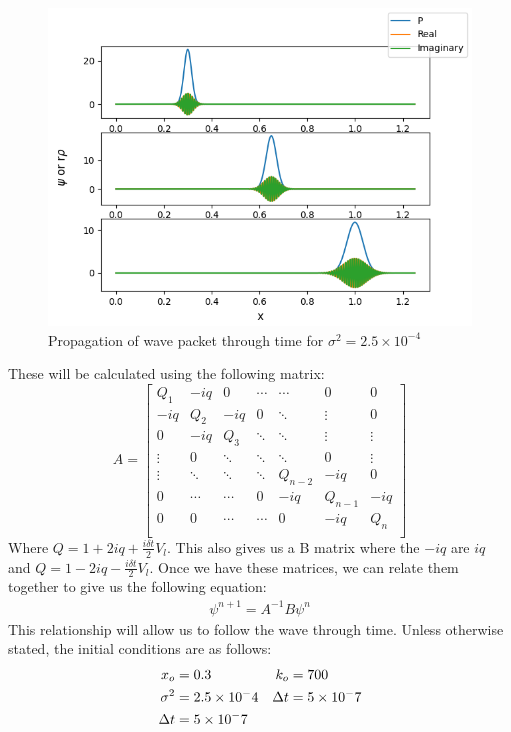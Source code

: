 \documentclass[pra,twocolumn,showpacs,amsmath,amssymb]{revtex4-2}
\begin{document}
\begin{figure}[t!]
\includegraphics[scale=0.5]{psi_x_wo.png}
\caption{Propagation of wave packet through time for $\sigma^2 = 2.5 \times 10^{-4}$}\label{Poincare0.5}
\end{figure}

\par These will be calculated using the following matrix:
\[
  A =
  \left[ {\begin{array}{ccccccc}
    Q_1 & -iq & 0 & \cdots & \cdots & 0 & 0\\
    -iq & Q_2 & -iq & 0 & \ddots & \vdots & 0\\
    0 & -iq & Q_3 & \ddots & \ddots & \vdots & \vdots\\ 
    \vdots & 0 & \ddots & \ddots & \ddots & 0 & \vdots \\
    \vdots & \ddots & \ddots & \ddots & Q_{n-2} & -iq & 0\\
    0 & \cdots & \cdots & 0 & -iq & Q_{n-1} & -iq\\
    0 & 0 & \cdots & \cdots & 0 & -iq & Q_n\\
  \end{array} } \right]
\]
Where $Q = 1 + 2iq + \frac{i\delta t}{2} V_l$. This also gives us a B matrix where the $-iq$ are $iq$ and $Q = 1 - 2iq -\frac{i\delta t}{2}V_l$. Once we have these matrices, we can relate them together to give us the following equation:
\begin{align}
    \psi^{n+1} = A^{-1} B \psi^n
\end{align}
This relationship will allow us to follow the wave through time. Unless otherwise stated, the initial conditions are as follows:
\begin{align}
    x_o &= 0.3 & k_o &= 700 \notag\\
    \sigma^2 &= 2.5 \times 10^-4 & \Delta t &= 5 \times 10^-7 \notag \\
    \Delta t &= 5 \times 10^-7 \notag
\end{align}
\end{document}
